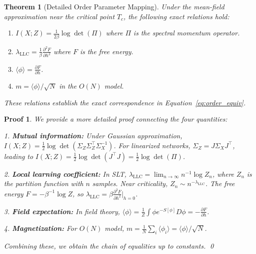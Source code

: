 \documentclass[11pt, a4paper]{article}
\newtheorem{theo}{Theorem}[section]
\theoremstyle{plain}
\newtheorem*{pf}{Proof}
\begin{document}
\begin{theo}[Detailed Order Parameter Mapping]\label{theo:order_detailed}
Under the mean-field approximation near the critical point $T_c$, the following exact relations hold:
\begin{enumerate}
    \item $I(X;Z) = \frac{1}{2\beta}\log\det(\Pi)$ where $\Pi$ is the spectral momentum operator.
    \item $\lambda_{\text{LLC}} = \frac{1}{\beta}\frac{\partial^2 F}{\partial h^2}$ where $F$ is the free energy.
    \item $\langle\phi\rangle = \frac{\partial F}{\partial h}$.
    \item $m = \langle\phi\rangle/\sqrt{N}$ in the $O(N)$ model.
\end{enumerate}
These relations establish the exact correspondence in Equation~\eqref{eq:order_equiv}.
\end{theo}

\begin{pf}
We provide a more detailed proof connecting the four quantities:

1. \textbf{Mutual information:} Under Gaussian approximation, $I(X;Z) = \frac{1}{2}\log\det(\Sigma_Z\Sigma_Z^\top\Sigma_X^{-1})$. For linearized networks, $\Sigma_Z = J\Sigma_X J^\top$, leading to $I(X;Z) = \frac{1}{2}\log\det(J^\top J) = \frac{1}{2}\log\det(\Pi)$.

2. \textbf{Local learning coefficient:} In SLT, $\lambda_{\text{LLC}} = \lim_{n\to\infty} n^{-1}\log Z_n$, where $Z_n$ is the partition function with $n$ samples. Near criticality, $Z_n \sim n^{-\lambda_{\text{LLC}}}$. The free energy $F = -\beta^{-1}\log Z$, so $\lambda_{\text{LLC}} = \beta\frac{\partial^2 F}{\partial h^2}|_{h=0}$.

3. \textbf{Field expectation:} In field theory, $\langle\phi\rangle = \frac{1}{Z}\int \phi e^{-S[\phi]} D\phi = -\frac{\partial F}{\partial h}$.

4. \textbf{Magnetization:} For $O(N)$ model, $m = \frac{1}{N}\sum_i \langle\phi_i\rangle = \langle\phi\rangle/\sqrt{N}$.

Combining these, we obtain the chain of equalities up to constants.
\qed
\end{pf}
\end{document}
